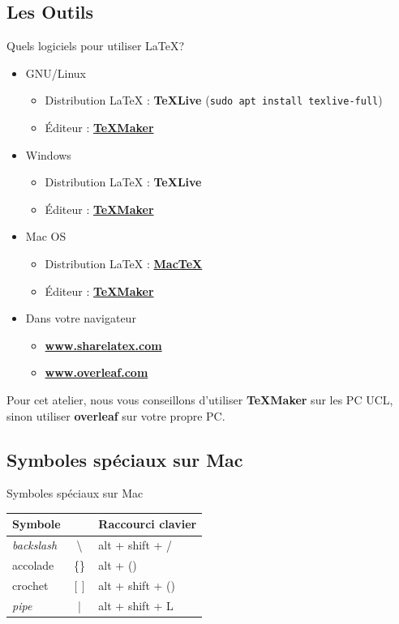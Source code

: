 \documentclass[10pt,svgnames,usenames,table]{beamer} %
\begin{document}
\subsection{Les Outils}
\begin{frame}{Quels logiciels pour utiliser \LaTeX{}?}

  \begin{itemize}
	  \item GNU/Linux
	  \begin{itemize}
	  	\item Distribution \LaTeX{} : \textbf{TeXLive}
          {\tiny (\lstinline|sudo apt install texlive-full|)}
		\item Éditeur : \textbf{\href{http://www.xm1math.net/texmaker/}{TeXMaker}}
	  \end{itemize}
	  \item Windows
	  \begin{itemize}
        \item Distribution \LaTeX{} : \textbf{TeXLive}
        \item Éditeur : \textbf{\href{http://www.xm1math.net/texmaker/}{TeXMaker}}
	  \end{itemize}
	  \item Mac OS
	  \begin{itemize}
        \item Distribution \LaTeX{} : \textbf{\href{https://www.tug.org/mactex/}{MacTeX}}
		\item Éditeur : \textbf{\href{http://www.xm1math.net/texmaker/}{TeXMaker}}
	  \end{itemize}
	  \item Dans votre navigateur
	  \begin{itemize}
  		\item \textbf{\url{www.sharelatex.com}}
		\item \textbf{\url{www.overleaf.com}}
	  \end{itemize}
  \end{itemize}
  Pour cet atelier, nous vous conseillons d'utiliser \textbf{TeXMaker} sur les PC UCL, sinon utiliser \textbf{overleaf} sur votre propre PC. 
\end{frame}

\subsection{Symboles spéciaux sur Mac}
\begin{frame}{Symboles spéciaux sur Mac}
  \begin{center}
    \begin{tabular}{|lc|l|}
      \hline
      Symbole & & Raccourci clavier \\\hline
      \textit{backslash} & \textbackslash & alt + shift + / \\
      accolade & \{\} & alt + () \\
      crochet & $[]$ & alt + shift + () \\
      \textit{pipe} & | & alt + shift + L \\
      \hline
    \end{tabular}
  \end{center}
\end{frame}
\end{document}
